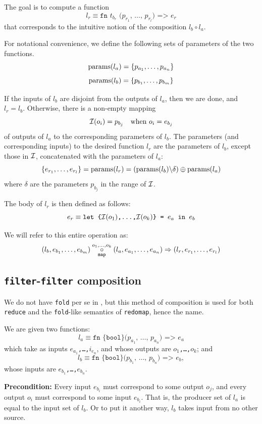 The goal is to compute a function
\[
l_{r} \equiv \texttt{fn $t_{b_{r}}$ ($p_{r_{1}}$, \ldots, $p_{r_{l}}$)
=> $e_{r}$}
\]
that corresponds to the intuitive notion of the composition $l_{b}
\circ l_{a}$.

For notational convenience, we define the following sets of parameters
of the two functions.
\[
\textrm{params}(l_{a}) = \{p_{a_{1}}, \ldots, p_{a_{n}}\}
\]
\[
\textrm{params}(l_{b}) = \{p_{b_{1}}, \ldots, p_{b_{m}}\}
\]

If the inputs of $l_{b}$ are disjoint from the outputs of $l_{a}$,
then we are done, and $l_{r} = l_{b}$.  Otherwise, there is a
non-empty mapping
\[
\mathcal{I}(o_{i}) = p_{b_{j}} \quad \textrm{when $o_{i} = e_{b_{j}}$}
\]
of outputs of $l_{a}$ to the corresponding parameters of $l_{b}$.  The
parameters (and corresponding inputs) to the desired function $l_{r}$
are the parameters of $l_{b}$, except those in $\mathcal{I}$,
concatenated with the parameters of $l_{a}$:
\[
\{e_{r_{1}},\ldots,e_{r_{l}}\} = \textrm{params}(l_{r}) = (\textrm{params}(l_{b}) \backslash \delta) \oplus \textrm{params}(l_{a})
\]
where $\delta$ are the parameters $p_{b_{j}}$ in the range of
$\mathcal{I}$.

The body of $l_{r}$ is then defined as follows:
\[
e_{r} \equiv \texttt{let \{$\mathcal{I}(o_{1})$,\ldots,$\mathcal{I}(o_{k})$\} = $e_{a}$ in $e_{b}$}
\]

We will refer to this entire operation as:
\[
(l_{b},e_{b_{1}},\ldots,e_{b_{m}}) \underset{\texttt{map}}{\overset{o_1,\ldots,o_k}\circ}(l_{a},e_{a_{1}},\ldots,e_{a_{n}}) \Rightarrow (l_{r},e_{r_{1}},\ldots,e_{r_{l}})
\]

\subsection{\texttt{filter}-\texttt{filter} composition}

We do not have \texttt{fold} per se in \LO{}, but this method of
composition is used for both \texttt{reduce} and the
\texttt{fold}-like semantics of \texttt{redomap}, hence the name.

We are given two functions:
\[
l_{a}\equiv\texttt{fn \{bool\} ($p_{a_{1}}$, \ldots, $p_{a_{n}}$) => $e_{a}$}
\]
which take as inputs \texttt{$e_{a_{1}}$,\ldots,$i_{e_{n}}$}, and whose
outputs are \texttt{$o_1$,\ldots,$o_k$}; and
\[
l_{b}\equiv\texttt{fn \{bool\} ($p_{b_{1}}$, \ldots, $p_{b_{n}}$) => $e_{b}$},
\]
whose inputs are \texttt{$e_{b_{1}}$,\ldots,$e_{b_{n}}$}.

\textbf{Precondition:} Every input $e_{b_{i}}$ must correspond to some
output $o_{j}$, and every output $o_{i}$ must correspond to some input
$e_{b_{i}}$.  That is, the producer set of $l_{a}$ is equal to the
input set of $l_{b}$.  Or to put it another way, $l_{b}$ takes input
from no other source.

